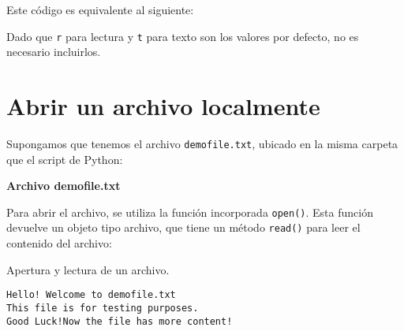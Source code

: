 Este código es equivalente al siguiente:

\begin{Shaded}
\begin{Highlighting}[]
\OperatorTok{=} \NormalTok{(}\NormalTok{, }\NormalTok{)}
\end{Highlighting}
\end{Shaded}

Dado que \texttt{\textquotesingle{}r\textquotesingle{}} para lectura y
\texttt{\textquotesingle{}t\textquotesingle{}} para texto son los
valores por defecto, no es necesario incluirlos.

\section{Abrir un archivo localmente}

Supongamos que tenemos el archivo \texttt{demofile.txt}, ubicado en la
misma carpeta que el script de Python:

\textbf{Archivo demofile.txt}

\begin{Shaded}
\begin{Highlighting}[]
\end{Highlighting}
\end{Shaded}

Para abrir el archivo, se utiliza la función incorporada
\texttt{open()}. Esta función devuelve un objeto tipo archivo, que tiene
un método \texttt{read()} para leer el contenido del archivo:\\

\begin{code} Apertura y lectura de un archivo.
\begin{Shaded}
\begin{Highlighting}[]
\OperatorTok{=} \NormalTok{(}\NormalTok{, }\NormalTok{)}
\end{Highlighting}
\end{Shaded}

\begin{verbatim}
Hello! Welcome to demofile.txt
This file is for testing purposes.
Good Luck!Now the file has more content!
\end{verbatim}
\end{code}

